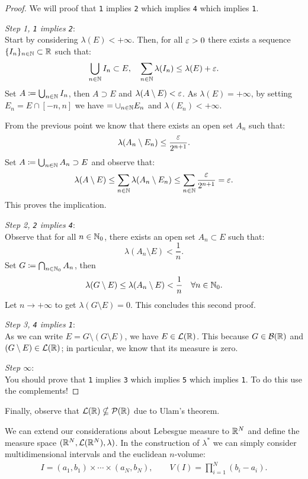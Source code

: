 \begin{proof} We will proof that \texttt{1} implies \texttt{2} which implies \texttt{4} which implies \texttt{1}.
	
	\textit{Step 1, \texttt{1} implies \texttt{2}}:\\
	Start by considering $\lambda(E)<+\infty$. Then, for all $\varepsilon>0$ there exists a sequence $\{I_n\}_{n \in \mathbb N} \subset \mathbb R$ such that:
	$$
		\bigcup_{n \in \mathbb N}I_n \subset E, 
		\quad \sum_{n \in \mathbb N}\lambda(I_n)
		\leq \lambda(E) + \varepsilon
	.
	$$ 
	Set $A \coloneqq \bigcup_{n \in \mathbb N}I_n$, then $A \supset E$ and $\lambda(A \setminus E)<\varepsilon$.
	As $\lambda(E)=+\infty$, by setting $E_n=E\cap [-n,n]$ we have $=\cup_{n \in \mathbb N}E_n$ and $\lambda(E_n)<+\infty$.
	
	From the previous point we know that there exists an open set $A_n$ such that:
	$$
		\lambda(A_n \setminus E_n)
		\leq\frac{\varepsilon}{2^{n+1}}
	.
	$$
	Set $A \coloneqq \bigcup_{n \in \mathbb N}A_n \supset E$ and observe that:
	$$
		\lambda(A \setminus E)
		\leq \sum_{n \in \mathbb N}\lambda(A_n \setminus E_n)
		\leq \sum_{n \in \mathbb N}\frac{\varepsilon}{2^{n+1}}
		= \varepsilon
	.
	$$
	This proves the implication.
	
	\textit{Step 2, \texttt{2} implies \texttt{4}}:\\
	Observe that for all $n \in \mathbb N_0$, there exists an open set $A_n \subset E$ such that:
	$$
		\lambda(A_n \setminus E)
		< \frac{1}{n}
	.
	$$
	Set $G \coloneqq \bigcap_{n \in \mathbb N_0}A_n$, then 
	$$
		\lambda(G \setminus E)
		\leq\lambda(A_n \setminus E)<\frac{1}{n} 
		\quad \forall n \in \mathbb N_0
	.
	$$
	Let $n \to +\infty$ to get $\lambda(G \setminus E) = 0$. This concludes this second proof.
	
	\textit{Step 3, \texttt{4} implies \texttt{1}}:\\
	As we can write $E = G \setminus (G \setminus E)$, we have $E \in \mathcal L(\mathbb R)$. This because $G \in \mathcal B(\mathbb R)$ and $(G \setminus E) \in \mathcal L(\mathbb R)$; in particular, we know that its measure is zero.
	
	\textit{Step $\infty$}:\\
	You should prove that \texttt{1} implies \texttt{3} which implies \texttt{5} which implies \texttt{1}. To do this use the complements!
\end{proof}

Finally, observe that $\mathcal L(\mathbb R) \nsubseteq \mathcal P(\mathbb R)$ due to Ulam's theorem.

We can extend our considerations about Lebesgue measure to $\mathbb R^N$ and define the measure space $(\mathbb R^N,\mathcal L(\mathbb R^N),\lambda)$. In the construction of $\lambda^*$ we can simply consider multidimensional intervals and the euclidean $n$-volume:
\begin{align*}
I=(a_1,b_1)\times\cdots\times(a_N,b_N), \qquad V(I)=\prod_{i=1}^{N}(b_i-a_i).
\end{align*}

